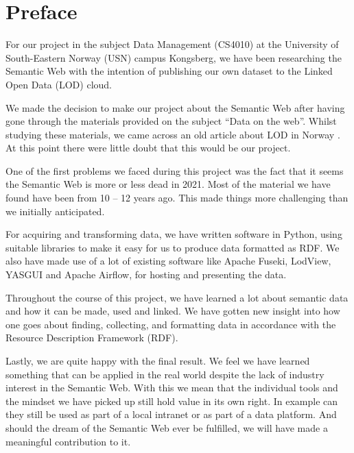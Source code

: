 \chapter*{Preface}

For our project in the subject Data Management (CS4010) at the University of South-Eastern Norway (USN) campus Kongsberg, we have been researching the Semantic Web with the intention of publishing our own dataset to the Linked Open Data (LOD) cloud.

\vspace{5mm}


We made the decision to make our project about the Semantic Web after having gone through the materials provided on the subject “Data on the web”. Whilst studying these materials, we came across an old article about LOD in Norway \cite{semicolon-ii}. At this point there were little doubt that this would be our project.

\vspace{5mm}

One of the first problems we faced during this project was the fact that it seems the Semantic Web is more or less dead in 2021. Most of the material we have found have been from 10 – 12 years ago. This made things more challenging than we initially anticipated. 

\vspace{5mm}

For acquiring and transforming data, we have written software in Python, using suitable libraries to make it easy for us to produce data formatted as RDF. We also have made use of a lot of existing software like Apache Fuseki, LodView, YASGUI and Apache Airflow, for hosting and presenting the data.

\vspace{5mm}

Throughout the course of this project, we have learned a lot about semantic data and how it can be made, used and linked. We have gotten new insight into how one goes about finding, collecting, and formatting data in accordance with the  Resource Description Framework (RDF).

\vspace{5mm}

Lastly, we are quite happy with the final result. We feel we have learned something that can be applied in the real world despite the lack of industry interest in the Semantic Web. With this we mean that the individual tools and the mindset we have picked up still hold value in its own right. In example can they still be used as part of a local intranet or as part of a data platform. And should the dream of the Semantic Web ever be fulfilled, we will have made a meaningful contribution to it.



